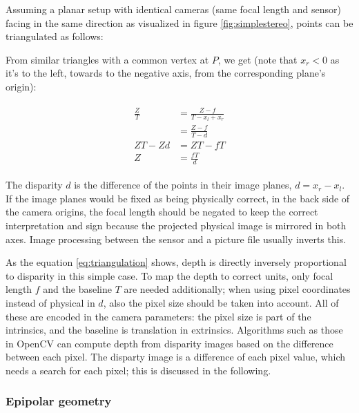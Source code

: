 Assuming a planar setup with identical cameras (same focal length and sensor) facing in the same direction as visualized in figure \ref{fig:simplestereo}, points can be triangulated as follows:

From similar triangles with a common vertex at $P$, we get (note that $x_r < 0$ as it's to the left, towards to the negative axis, from the corresponding plane's origin):

\begin{align} \label{eq:triangulation} \begin{split}
	\frac{Z}{T} &= \frac{Z-f}{T - x_l + x_r} \\
	&= \frac{Z-f}{T - d}\\
	ZT - Zd &= ZT - fT\\
	Z &= \frac{fT}{d}
\end{split} \end{align}

The disparity $d$ is the difference of the points in their image planes, $d = x_r - x_l$.
If the image planes would be fixed as being physically correct, in the back side of the camera origins, the focal length should be negated to keep the correct interpretation and sign because the projected physical image is mirrored in both axes. Image processing between the sensor and a picture file usually inverts this.

As the equation \ref{eq:triangulation} shows, depth is directly inversely proportional to disparity in this simple case.
To map the depth to correct units, only focal length $f$ and the baseline $T$ are needed additionally; when using pixel coordinates instead of physical in $d$, also the pixel size should be taken into account.
All of these are encoded in the camera parameters: the pixel size is part of the intrinsics, and the baseline is translation in extrinsics.
Algorithms such as those in OpenCV \cite{opencv} can compute depth from disparity images based on the difference between each pixel.
The disparty image is a difference of each pixel value, which needs a search for each pixel;
this is discussed in the following.


\subsubsection{Epipolar geometry} %

